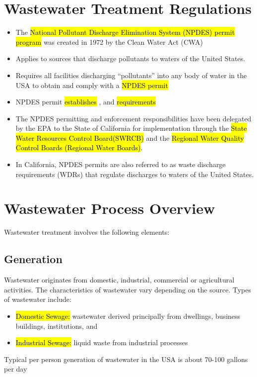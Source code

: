 \section{Wastewater Treatment Regulations}

\begin{itemize}
\item The \hl{National Pollutant Discharge Elimination System (NPDES) permit program} was created in 1972 by the Clean Water Act (CWA)
\item Applies to sources that discharge pollutants to waters of the United States.
\item Requires all facilities discharging “pollutants” into any body of water in the USA to obtain and comply with a \hl{NPDES permit}
\item NPDES permit \hl{establishes} ,  and  \hl{requirements}\\
\item The NPDES permitting and enforcement responsibilities have been delegated by the EPA to the State of California for implementation through the \hl{State Water Resources Control Board(SWRCB)} and the  \hl{Regional Water Quality Control Boards (Regional Water Boards)}.
\item In California, NPDES permits are also referred to as waste discharge requirements (WDRs) that regulate discharges to waters of the United States.
\end{itemize}


\section{Wastewater Process Overview}
Wastewater treatment involves the following elements:

\subsection{Generation}

Wastewater originates from domestic, industrial, commercial or agricultural activities. The characteristics of wastewater vary depending on the source. Types of wastewater include: 
\begin{itemize}
\item \hl{Domestic Sewage:}  wastewater derived principally from dwellings, business buildings, institutions, and \\
\item \hl{Industrial Sewage:}  liquid waste from industrial processes\\
\end{itemize}
Typical per person generation of wastewater in the USA is about 70-100 gallons per day

